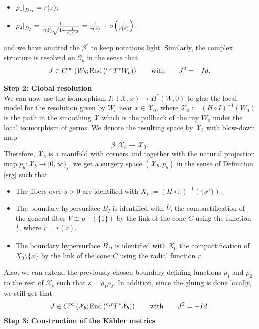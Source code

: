 \documentclass[a4paper,11pt]{article}
\newcommand\restr[2]{{%
  \left.\kern-\nulldelimiterspace %
  #1 %
  \littletaller %
  \right|_{#2} %
  }}
\newcommand{\littletaller}{\mathchoice{\vphantom{\big|}}{}{}{}}
\begin{document}
\begin{itemize}
    \item $\restr{\rho_1}{B_{II}} = r(z)$;
    \item $\restr{\rho_2}{B_I} = \frac{1}{ r(\tilde z) \sqrt{1 + \frac{1}{r(\tilde z)^2}}} = \frac{1}{r(\tilde z)} + o\left(\frac{1}{r(\tilde z)} \right)$,
\end{itemize}
and we have omitted the $\beta^{*}$ to keep notations light. Similarly, the complex structure is resolved on $\mathcal{C}_b$ in the sense that 
$$
J \in C^\infty \left(W_b ; \mathrm{End}\left(\hspace{0.01cm} ^{c,\varepsilon} T^{*} W_b \right)  \right)\hspace{0.7cm} \text{with} \hspace{0.7cm} J^2 = -Id.
$$


\textbf{Step 2: Global resolution}\\

We can now use the isomorphism $I : (\mathcal{X},x) \rightarrow H^{*}(W,0)$ to glue the local model for the resolution given by $W_b$ near $x \in \mathcal{X}_0$, where $\mathcal{X}_0 := (H \circ I)^{-1}(W_0)$ is the path in the smoothing $\mathcal{X}$ which is the pullback of the ray $W_0$ under the local isomorphism of germs. We denote the resulting space by $\mathcal{X}_b$ with blow-down map
$$
\beta : \mathcal{X}_b \rightarrow \mathcal{X}_0.
$$
Therefore, $\mathcal{X}_b$ is a manifold with corners and together with the natural projection map $ p_b : \mathcal{X}_b \rightarrow [0, \infty)_s$, we get a surgery space $(\mathcal{X}_b, p_b)$ in the sense of Definition \ref{srg} such that 
\begin{itemize}
    \item The fibers over $s >0$ are identified with $X_s := (H \circ \pi )^{-1}(\{s^\mu \})$.
    \item The boundary hypersurface $B_I$ is identified with $\overline{V}$, the compactification of the general fiber $V \cong p^{-1}(\{ 1\})$ by the link of the cone $C$ using the function $\frac{1}{\tilde r}$, where $\tilde r = r(\tilde z)$.
    \item The boundary hypersurface $B_{II}$ is identified with $\overline{X_0}$ the compactification of $X_0 \setminus \{ x\}$ by the link of the cone $C$ using the radial function $r$.
\end{itemize}
Also, we can extend the previously chosen boundary defining functions $\rho_1$ and $\rho_2$ to the rest of $\mathcal{X}_b$ such that $s= \rho_1 \rho_2 $. In addition, since the gluing is done locally, we still get that
$$
J \in C^\infty \left( \mathcal{X}_b; \mathrm{End}\left(\hspace{0.01cm} ^{c,\varepsilon} T^{*} \mathcal{X}_b \right)  \right)\hspace{0.7cm} \text{with} \hspace{0.7cm} J^2 = -Id.
$$
\textbf{Step 3: Construction of the Kähler metrics}\\
\end{document}
